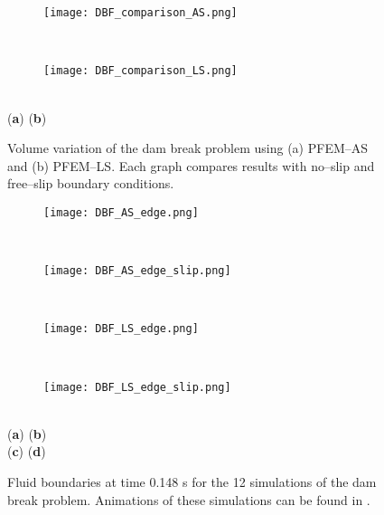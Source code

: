 \documentclass[final,3p,times]{elsarticle}
\begin{document}
\begin{figure}[t!]
\captionsetup[subfigure]{labelformat=empty}
\centering 
	\begin{subfigure}[b]{0.48\textwidth}
		\texttt{[image: DBF\_comparison\_AS.png]}
		\caption{}
		\label{Fig:dbf_resultsASLS_a}
	\end{subfigure}
	~
	\begin{subfigure}[b]{0.48\textwidth}	
		\texttt{[image: DBF\_comparison\_LS.png]}
		\caption{}
		\label{Fig:dbf_resultsASLS_b}
	\end{subfigure}
	\\
	\vspace{-65mm}
	\hspace{-80mm} \footnotesize{(\textbf{a})} \hspace{75mm} (\textbf{b}) 
	\\
	\vspace{55mm}
	\caption{Volume variation of the dam break problem using (a) PFEM--AS and (b) PFEM--LS. Each graph compares results with no--slip and free--slip boundary conditions.}
\label{Fig:dbf_resultsASLS}
\end{figure}
%
\begin{figure}[t!]
\captionsetup[subfigure]{labelformat=empty}
\centering 
	\begin{subfigure}[b]{0.48\textwidth}
		\texttt{[image: DBF\_AS\_edge.png]}
		\caption{}
		\label{Fig:dbf_contour_a}
	\end{subfigure}
	~
	\begin{subfigure}[b]{0.48\textwidth}	
		\texttt{[image: DBF\_AS\_edge\_slip.png]}
		\caption{}
		\label{Fig:dbf_contour_b}
	\end{subfigure}
	\\[-1ex]
	\begin{subfigure}[b]{0.48\textwidth}
		\texttt{[image: DBF\_LS\_edge.png]}
		\caption{}
		\label{Fig:dbf_contour_c}
	\end{subfigure}
	~
	\begin{subfigure}[b]{0.48\textwidth}	
		\texttt{[image: DBF\_LS\_edge\_slip.png]}
		\caption{}
		\label{Fig:dbf_contour_d}
	\end{subfigure}
	\\
	\vspace{-57mm}
	\hspace{-79mm} \footnotesize{(\textbf{a})} \hspace{77mm} (\textbf{b}) 
	\\
	\vspace{25mm}
	\hspace{-79mm} \footnotesize{(\textbf{c})} \hspace{77mm} (\textbf{d}) 
	\\
	\vspace{19mm}
	\caption{Fluid boundaries at time 0.148 s for the 12 simulations of the dam break problem. Animations of these simulations can be found in \citep{YoutubeAll}.} 
\label{Fig:dbf_contour}
\end{figure}
\end{document}
